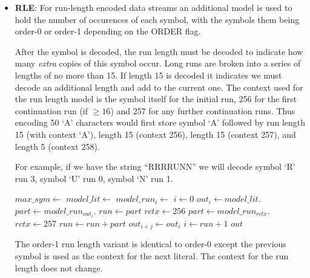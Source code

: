\documentclass[a4paper]{article}
\begin{document}
\begin{itemize}
\item{\textbf{RLE}:}
For run-length encoded data streams an additional model is used to
hold the number of occurences of each symbol, with the symbols them
being order-0 or order-1 depending on the ORDER flag.

After the symbol is decoded, the run length must be decoded to
indicate how many \emph{extra} copies of this symbol occur.  Long runs
are broken into a series of lengths of no more than 15.  If length 15
is decoded it indicates we must decode an additional length and add to
the current one.  The context used for the run length model is the
symbol itself for the initial run, 256 for the first continuation run
(if $\ge 16$) and 257 for any further continuation runs.  Thus encoding
50 `A' characters would first store symbol `A' followed by run length
15 (with context `A'), length 15 (context 256), length 15 (context
257), and length 5 (context 258).

For example, if we have the string ``RRRRUNN'' we will decode
symbol `R' run 3, symbol `U' run 0, symbol `N' run 1.

\begin{algorithmic}[1]
  \State $max\_sym \gets $
  \State $model\_lit \gets $
    \State $model\_run_i \gets $
  \EndFor
  \Statex
  \State $i \gets 0$
    \State $out_i \gets model\_lit.$
    \State $part \gets model\_run_{out_i}.$
    \State $run \gets part$
    \State $rctx \gets 256$
      \State $part \gets model\_run_{rctx}.$
      \State $rctx \gets 257$
      \State $run \gets run + part$
    \EndWhile
      \State $out_{i+j} \gets out_i$
    \EndFor
    \State $i \gets run+1$
  \EndWhile
  \State \Return $out$
\EndFunction
\end{algorithmic}

The order-1 run length variant is identical to order-0 except the
previous symbol is used as the context for the next literal.  The
context for the run length does not change.


\end{itemize}
\end{document}
